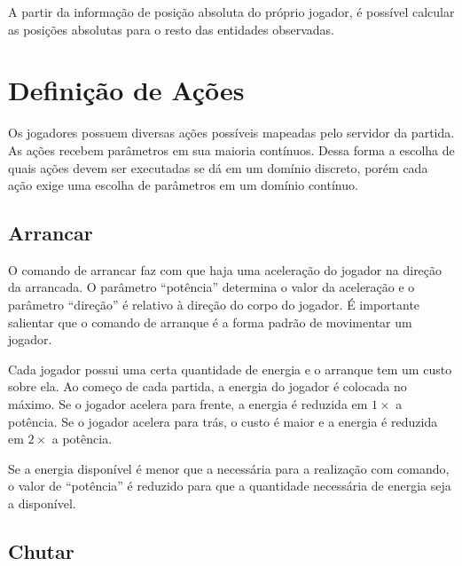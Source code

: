 \par A partir da informação de posição absoluta do próprio jogador, é possível calcular as posições absolutas para o resto das entidades observadas.



\section{Definição de Ações}

\par Os jogadores possuem diversas ações possíveis mapeadas pelo servidor da partida. As ações recebem parâmetros em sua maioria contínuos. Dessa forma a escolha de quais ações devem ser executadas se dá em um domínio discreto, porém cada ação exige uma escolha de parâmetros em um domínio contínuo.

\subsection{Arrancar}
\label{sec:dash}

O comando de arrancar faz com que haja uma aceleração do jogador na direção da arrancada. O parâmetro ``potência'' determina o valor da aceleração e o parâmetro ``direção'' é relativo à direção do corpo do jogador. É importante salientar que o comando de arranque é a forma padrão de movimentar um jogador.

Cada jogador possui uma certa quantidade de energia e o arranque tem um custo sobre ela. Ao começo de cada partida, a energia do jogador é colocada no máximo. Se o jogador acelera para frente, a energia é reduzida em $1\times$ a potência. Se o jogador acelera para trás, o custo é maior e a energia é reduzida em $2\times$ a potência.

Se a energia disponível é menor que a necessária para a realização com comando, o valor de ``potência'' é reduzido para que a quantidade necessária de energia seja a disponível.

\subsection{Chutar}

